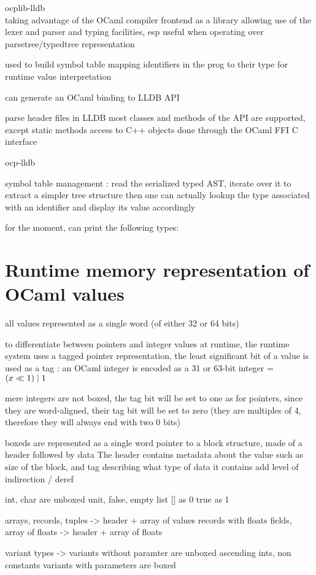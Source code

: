 
ocplib-lldb \\

taking advantage of the OCaml compiler frontend as a library
allowing use of the lexer and parser and typing facilities, esp
useful when operating over parsetree/typedtree representation

used to build symbol table mapping identifiers in the prog to their type
for runtime value interpretation

can generate an OCaml binding to LLDB API

parse header files in LLDB
most classes and methods of the API are supported, except static methods
access to C++ objects done through the OCaml FFI C interface

ocp-lldb

symbol table management :
read the serialized typed AST, iterate over it to extract a simpler tree
structure
then one can actually lookup the type associated with an identifier and display
its value accordingly

for the moment, can print the following types:

\section{Runtime memory representation of OCaml values}

all values represented as a single word (of either 32 or 64 bits)

to differentiate between pointers and integer values at runtime, the runtime
system uses a tagged pointer representation, the least significant bit of a
value is used as a tag : an OCaml integer is encoded as a 31 or 63-bit integer = $ (x \ll 1) \mathrel{|} 1 $

mere integers are not boxed, the tag bit will be set to one
as for pointers, since they are word-aligned, their tag bit will be set to zero
(they are multiples of 4, therefore they will always end with two 0 bits)

\Glspl{boxed} are represented as a single word pointer to a block structure, made of a
header followed by data
The header contains metadata about the value such as size of the block, and tag describing what type of data it
contains
add level of indirection / deref


int, char are unboxed
unit, false, empty list [] as 0
true as 1

arrays, records, tuples -> header + array of values
records with floats fields, array of floats -> header + array of floats

variant types -> variants without paramter are unboxed ascending ints, non
constants variants with parameters are boxed
